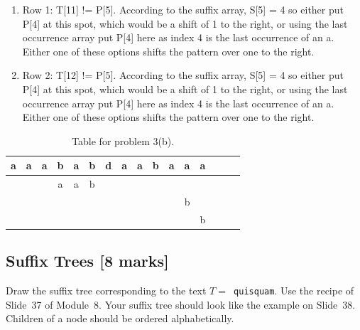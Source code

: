 \documentclass[12pt]{article}
\begin{document}
\begin{itemize}
\begin{enumerate}
\item Row 1: T[11] != P[5]. According to the suffix array, S[5] = 4 so either put P[4] at this spot, which would be a shift of 1 to the right, or using the last occurrence array put P[4] here as index 4 is the last occurrence of an a. Either one of these options shifts the pattern over one to the right.

\item Row 2: T[12] != P[5]. According to the suffix array, S[5] = 4 so either put P[4] at this spot, which would be a shift of 1 to the right, or using the last occurrence array put P[4] here as index 4 is the last occurrence of an a. Either one of these options shifts the pattern over one to the right.
\end{enumerate}



\begin{table}[!ht]
\Large{
\begin{center}
\begin{tabular}{|c|c|c|c|c|c|c|c|c|c|c|c|c|c|c|c|}
\hline
a&a&a&b&a&b&d&a&a&b&a&a&a\\
\hline
&&&a&a&b&&&&&&&\\
\hline
&&&&&&&&&&&b&\\
\hline
&&&&&&&&&&&&b\\

\hline
\end{tabular}
\end{center}}
\caption{Table for problem 3(b).}\label{kmp}
\end{table}
\end{itemize}

\subsection{Suffix Trees [8 marks]} 
Draw the suffix tree corresponding to the text
$T =$\verb[ quisquam[.  Use the recipe of Slide~37 of Module~8.
Your suffix tree should look like the example on Slide~38.
Children of a node should be ordered alphabetically.
\end{document}
